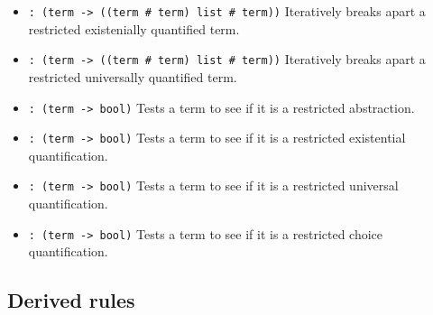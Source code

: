 \begin{itemize}
\item {} \verb|: (term -> ((term # term) list # term))|\newline
Iteratively breaks apart a restricted existenially quantified term.

\item {} \verb|: (term -> ((term # term) list # term))|\newline
Iteratively breaks apart a restricted universally quantified term.

\item {} \verb|: (term -> bool)|\newline
Tests a term to see if it is a restricted abstraction.

\item {} \verb|: (term -> bool)|\newline
Tests a term to see if it is a restricted existential quantification.

\item {} \verb|: (term -> bool)|\newline
Tests a term to see if it is a restricted universal quantification.

\item {} \verb|: (term -> bool)|\newline
Tests a term to see if it is a restricted choice quantification.
\end{itemize}

\subsection*{Derived rules}

